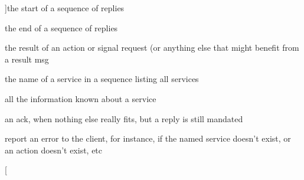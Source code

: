 \begin{Desc}
\begin{description}
{}]the start of a sequence of replies \item[{\em 
UPK\_\-REPL\_\-SEQ\_\-END\label{group__client__protocol_ggab04f5fc5314f6296f0ef4b171d1b4282a08f5de1191d69da4a59758eeef26bac2}
}]the end of a sequence of replies \item[{\em 
UPK\_\-REPL\_\-RESULT\label{group__client__protocol_ggab04f5fc5314f6296f0ef4b171d1b4282a553cb105e6ff4b627e2799cfc3f8f74c}
}]the result of an action or signal request (or anything else that might benefit from a result msg \item[{\em 
UPK\_\-REPL\_\-LISTING\label{group__client__protocol_ggab04f5fc5314f6296f0ef4b171d1b4282ac158a8306626930b47ef905a7830e07f}
}]the name of a service in a sequence listing all services \item[{\em 
UPK\_\-REPL\_\-SVCINFO\label{group__client__protocol_ggab04f5fc5314f6296f0ef4b171d1b4282ae1add19bc555a5ce4badb159f98e0e37}
}]all the information known about a service \item[{\em 
UPK\_\-REPL\_\-ACK\label{group__client__protocol_ggab04f5fc5314f6296f0ef4b171d1b4282acbf1523c6bf5cc236d060d6d0ba7db2d}
}]an ack, when nothing else really fits, but a reply is still mandated \item[{\em 
UPK\_\-REPL\_\-ERROR\label{group__client__protocol_ggab04f5fc5314f6296f0ef4b171d1b4282aa041df31800d879a09a3ce477e222c6d}
}]report an error to the client, for instance, if the named service doesn't exist, or an action doesn't exist, etc \item[{\em 
}
\end{description}
\end{Desc}
